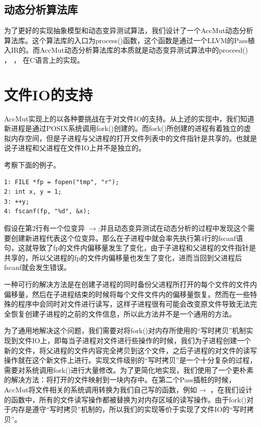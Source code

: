 \documentclass[nofonts]{ctexrep}
\begin{document}
\subsection{动态分析算法库}
为了更好的实现抽象模型和动态变异测试算法，我们设计了一个AccMut动态分析算法库。这个算法库的入口为process()函数，这个函数是通过一个LLVM的Pass植入IR的。而AccMut动态分析算法库的本质就是动态变异测试算法中的proceed() ， \filterv ， \filterm 在C语言上的实现。

\section{文件IO的支持}
AccMut实现上的以各种要挑战在于对文件IO的支持。从上述的实现中，我们知道新进程是通过POSIX系统调用fork()创建的。而fork()所创建的进程有着独立的虚拟内存空间，但是子进程与父进程的打开文件列表中的文件指针是共享的。也就是说子进程和父进程在文件IO上并不是独立的。

考察下面的例子。

\begin{verbatim}
1: FILE *fp = fopen("tmp", "r");
2: int x, y = 1;
3: ++y;
4: fscanf(fp, "%d", &x);
\end{verbatim}

假设在第2行有一个位变异 $\rightarrow$;并且动态变异测试在动态分析的过程中发现这个需要创建新进程代表这个位变异。那么在子进程中就会率先执行第4行的fscanf语句，这就导致了fp的文件内偏移量发生了变化，由于子进程和父进程的文件指针是共享的，所以父进程的fp的文件内偏移量也发生了变化，进而当回到父进程后fscanf就会发生错误。

一种可行的解决方法是在创建子进程的同时备份父进程所打开的每个文件的文件内偏移量，然后在子进程结束的时候将每个文件文件内的偏移量恢复。然而在一些特殊的程序中会同时对文件进行读写，这样子进程很有可能会改变原文件导致无法完全恢复创建子进程的之前的文件信息，所以此方法并不是一个通用的方法。

为了通用地解决这个问题，我们需要对将fork()对内存所使用的``写时拷贝''机制实现到文件IO上，即每当子进程对文件进行些操作的时候，我们为子进程创建一个新的文件，将父进程的文件内容完全拷贝到这个文件，之后子进程的对文件的读写操作就在这个新文件上进行。实现文件级别的``写时拷贝''是一个十分复杂的过程，需要对系统调用fork()进行大量修改。为了更简化地实现，我们使用了一个更朴素的解决方法：将打开的文件映射到一块内存中。在第二个Pass插桩的时候，AccMut将文件相关的系统调用转换为我们自己写的函数，例如$\rightarrow$ ，在我们设计的函数中，所有的文件读写操作都被替换为对内存区域的读写操作。由于fork()对于内存是遵守``写时拷贝''机制的，所以我们的实现等价于实现了文件IO的``写时拷贝''。
\end{document}
